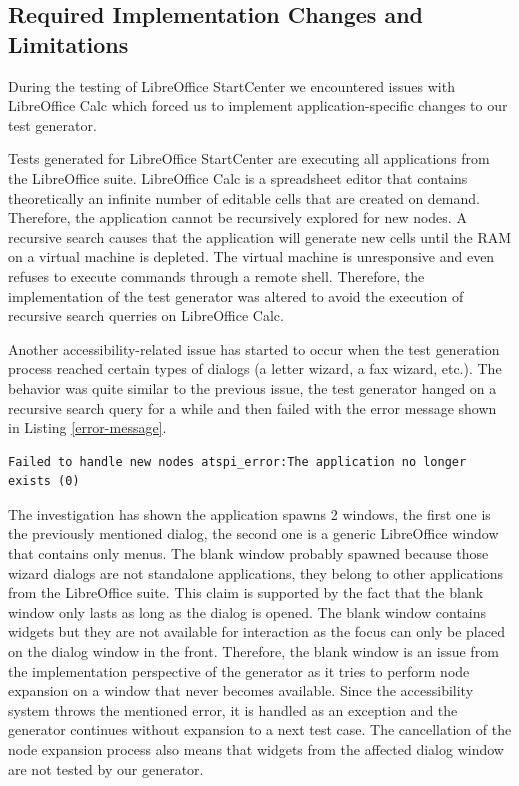 \subsection*{Required Implementation Changes and Limitations}
During the testing of LibreOffice StartCenter we encountered issues with LibreOffice Calc which forced us to implement application-specific changes to our test generator. 

Tests generated for LibreOffice StartCenter are executing all applications from the LibreOffice suite. LibreOffice Calc is a spreadsheet editor that contains theoretically an infinite number of editable cells that are created on demand. Therefore, the application cannot be recursively explored for new nodes. A recursive search causes that the application will generate new cells until the RAM on a virtual machine is depleted. The virtual machine is unresponsive and even refuses to execute commands through a remote shell. Therefore, the implementation of the test generator was altered to avoid the execution of recursive search querries on LibreOffice Calc.

Another accessibility-related issue has started to occur when the test generation process reached certain types of dialogs (a letter wizard, a fax wizard, etc.). The behavior was quite similar to the previous issue, the test generator hanged on a recursive search query for a while and then failed with the error message shown in Listing \ref{error-message}.

\begin{lstlisting}[caption={The accessibility layer error that prevents the generator from node expansion when testing LibreOffice StartCenter},label={error-message}]
Failed to handle new nodes atspi_error:The application no longer exists (0)
\end{lstlisting}

 The investigation has shown the application spawns 2 windows, the first one is the previously mentioned dialog, the second one is a generic LibreOffice window that contains only menus. The blank window probably spawned because those wizard dialogs are not standalone applications, they belong to other applications from the LibreOffice suite. This claim is supported by the fact that the blank window only lasts as long as the dialog is opened. The blank window contains widgets but they are not available for interaction as the focus can only be placed on the dialog window in the front. Therefore, the blank window is an issue from the implementation perspective of the generator as it tries to perform node expansion on a window that never becomes available. Since the accessibility system throws the mentioned error, it is handled as an exception and the generator continues without expansion to a next test case. The cancellation of the node expansion process also means that widgets from the affected dialog window are not tested by our generator.


